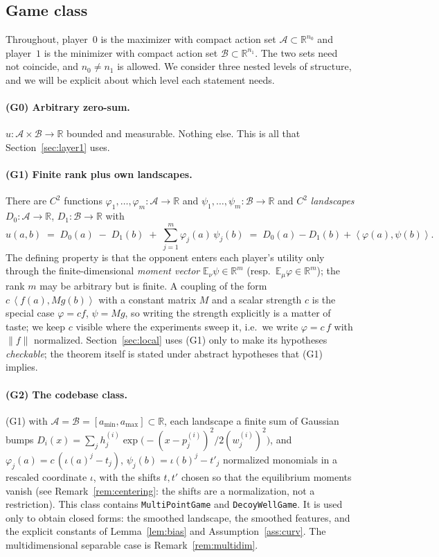 \documentclass[11pt]{article}
\theoremstyle{definition}
\newcommand{\R}{\mathbb{R}}
\newcommand{\E}{\mathbb{E}}
\newcommand{\cA}{\mathcal{A}}
\newcommand{\cB}{\mathcal{B}}
\newcommand{\ip}[2]{\left\langle #1, #2 \right\rangle}
\begin{document}
\subsection{Game class}\label{sec:class}

Throughout, player~$0$ is the maximizer with compact action set
$\cA \subset \R^{n_0}$ and player~$1$ is the minimizer with compact action set
$\cB \subset \R^{n_1}$. The two sets need not coincide, and $n_0 \ne n_1$ is
allowed. We consider three nested levels of structure, and we will be explicit
about which level each statement needs.

\paragraph{(G0) Arbitrary zero-sum.} $u : \cA \times \cB \to \R$ bounded and
measurable. Nothing else. This is all that Section~\ref{sec:layer1} uses.

\paragraph{(G1) Finite rank plus own landscapes.} There are $C^2$ functions
$\varphi_1,\dots,\varphi_m : \cA \to \R$ and $\psi_1,\dots,\psi_m : \cB \to \R$
and $C^2$ \emph{landscapes} $D_0 : \cA \to \R$, $D_1 : \cB \to \R$ with
\begin{equation}\label{eq:game}
  u(a,b) \;=\; D_0(a) \;-\; D_1(b) \;+\; \sum_{j=1}^{m}
  \varphi_j(a)\, \psi_j(b)
  \;=\; D_0(a) - D_1(b) + \ip{\varphi(a)}{\psi(b)} .
\end{equation}
The defining property is that the opponent enters each player's utility only
through the finite-dimensional \emph{moment vector}
$\E_\nu \psi \in \R^m$ (resp.\ $\E_\mu \varphi \in \R^m$); the rank $m$ may be
arbitrary but is finite. A coupling of the form $c\,\ip{f(a)}{M g(b)}$ with a
constant matrix $M$ and a scalar strength $c$ is the special case
$\varphi = c f$, $\psi = M g$, so writing the strength explicitly is a matter
of taste; we keep $c$ visible where the experiments sweep it, i.e.\ we write
$\varphi = c\, f$ with $\|f\|$ normalized. Section~\ref{sec:local} uses (G1)
only to make its hypotheses \emph{checkable}; the theorem itself is stated
under abstract hypotheses that (G1) implies.

\paragraph{(G2) The codebase class.} (G1) with $\cA = \cB = [a_{\min},
a_{\max}] \subset \R$, each landscape a finite sum of Gaussian bumps
$D_i(x) = \sum_j h^{(i)}_j \exp\big({-}(x - p^{(i)}_j)^2 / 2 (w^{(i)}_j)^2\big)$,
and $\varphi_j(a) = c\,(\iota(a)^j - t_j)$, $\psi_j(b) = \iota(b)^j - t'_j$
normalized monomials in a rescaled coordinate $\iota$, with the shifts
$t, t'$ chosen so that the equilibrium moments vanish (see
Remark~\ref{rem:centering}: the shifts are a normalization, not a restriction).
This class contains \texttt{MultiPointGame} and \texttt{DecoyWellGame}. It is
used only to obtain closed forms: the smoothed landscape, the smoothed
features, and the explicit constants of Lemma~\ref{lem:bias} and
Assumption~\ref{ass:curv}. The multidimensional separable case is
Remark~\ref{rem:multidim}.
\end{document}
